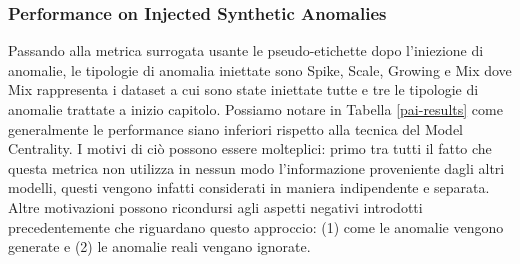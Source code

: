 \newpage
\subsubsection{Performance on Injected Synthetic Anomalies}
Passando alla metrica surrogata usante le pseudo-etichette dopo l'iniezione di anomalie, le tipologie di anomalia iniettate sono Spike, Scale, Growing e Mix dove Mix rappresenta i dataset a cui sono state iniettate tutte e tre le tipologie di anomalie trattate a inizio capitolo. Possiamo notare in Tabella \ref{pai-results} come generalmente le performance siano inferiori rispetto alla tecnica del Model Centrality. I motivi di ciò possono essere molteplici: primo tra tutti il fatto che questa metrica non utilizza in nessun modo l'informazione proveniente dagli altri modelli, questi vengono infatti considerati in maniera indipendente e separata. Altre motivazioni possono ricondursi agli aspetti negativi introdotti precedentemente che riguardano questo approccio: (1) come le anomalie vengono generate e (2) le anomalie reali vengano ignorate.

